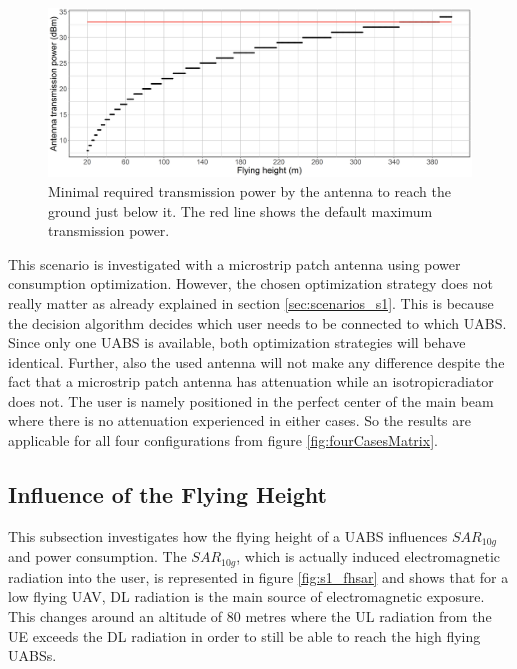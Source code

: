 \begin{figure}[h]
  \centering
  \includegraphics[width=\textwidth]{../results/s1/ptx.png}
  \caption{Minimal required transmission power by the antenna to reach the ground just below it. The red line shows the default maximum transmission power.}
  \label{fig:ptxfh}
\end{figure}

This scenario is investigated with a microstrip patch antenna using power consumption optimization. 
 However, the chosen optimization strategy does not really matter as already explained in section \ref{sec:scenarios_s1}. This is because the decision 
 algorithm decides which user 
needs to be connected to which \gls{UABS}. Since only one \gls{UABS} is available, both optimization strategies will behave identical.
Further, also the used antenna will not make any difference
despite the fact that a microstrip patch antenna has attenuation while an \gls{isotropicradiator} does not.
The user is namely positioned in the perfect center of the main beam where there is 
no attenuation experienced in either cases. So the results are applicable for all four configurations from figure \ref{fig:fourCasesMatrix}.

\FloatBarrier
\subsection{Influence of the Flying Height}
\label{sub:senario1_influenceOfFlyHeight}

This subsection investigates how the flying height of a \gls{UABS} influences $SAR_{10g}$ and power consumption.
The $SAR_{10g}$, which is actually induced electromagnetic radiation into the user, is represented in figure \ref{fig:s1_fhsar}
and shows that for a low flying \gls{UAV}, \gls{DL} radiation is the main source of electromagnetic exposure.
This changes around an altitude of 80 metres where the \gls{UL} radiation from the \gls{UE}
exceeds the \gls{DL} radiation in order to still be able to reach the high flying \gls{UABS}s.

